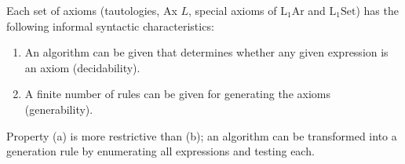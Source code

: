 Each set of axioms (tautologies, Ax $L$, special axioms of $\mathrm{L}_1\mathrm{Ar}$ and $\mathrm{L}_1\mathrm{Set}$) has the following informal syntactic characteristics:
\begin{enumerate}
\item[(a)] An algorithm can be given that determines whether any given expression is an axiom (decidability).
\item[(b)] A finite number of rules can be given for generating the axioms (generability).
\end{enumerate}
Property (a) is more restrictive than (b); an algorithm can be transformed into a generation rule by enumerating all expressions and testing each.
